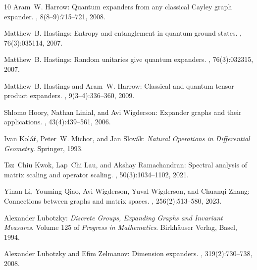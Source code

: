 \documentclass[11pt]{article}
\theoremstyle{plain}
\numberwithin{equation}{section}
\theoremstyle{definition}
\begin{document}
\begin{thebibliography}{10}
{\sc Aram~W. Harrow}: Quantum expanders from any classical {C}ayley graph
  expander.
, 8(8--9):715--721, 2008.

{\sc Matthew~B. Hastings}: Entropy and entanglement in quantum ground states.
, 76(3):035114, 2007.

{\sc Matthew~B. Hastings}: Random unitaries give quantum expanders.
, 76(3):032315, 2007.

{\sc Matthew~B. Hastings and Aram~W. Harrow}: Classical and quantum tensor
  product expanders.
, 9(3--4):336--360, 2009.

{\sc Shlomo Hoory, Nathan Linial, and Avi Wigderson}: Expander graphs and their
  applications.
, 43(4):439--561, 2006.
\newblock [\epfmtdoi{10.1090/S0273-0979-06-01126-8}]

{\sc Ivan Kol\'{a}\v{r}, Peter~W. Michor, and Jan Slov\'{a}k}: {\em Natural
  Operations in Differential Geometry}.
\newblock Springer, 1993.
\newblock [\epfmtdoi{10.1007/978-3-662-02950-3}]

{\sc Tsz~Chiu Kwok, Lap~Chi Lau, and Akshay Ramachandran}: Spectral analysis of
  matrix scaling and operator scaling.
, 50(3):1034--1102, 2021.
\newblock [\epfmtdoi{10.1137/20M1315981}]

{\sc Yinan Li, Youming Qiao, Avi Wigderson, Yuval Wigderson, and Chuanqi
  Zhang}: Connections between graphs and matrix spaces.
, 256(2):513--580, 2023.
\newblock [\epfmtdoi{10.1007/s11856-023-2515-7}]

{\sc Alexander Lubotzky}: {\em Discrete Groups, Expanding Graphs and Invariant
  Measures}.
\newblock Volume 125 of {\em Progress in Mathematics}.
\newblock Birkh\"{a}user Verlag, Basel, 1994.
\newblock [\epfmtdoi{10.1007/978-3-0346-0332-4}]

{\sc Alexander Lubotzky and Efim Zelmanov}: Dimension expanders.
, 319(2):730--738, 2008.


\end{thebibliography}
\end{document}
